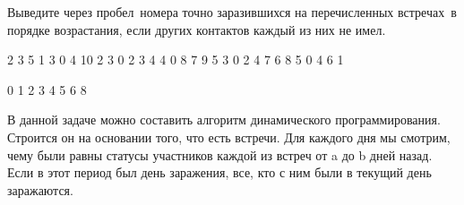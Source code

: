 Выведите через пробел номера точно заразившихся на перечисленных встречах в порядке возрастания, если других контактов каждый из них не имел.


\begin{myverbbox}[\small]{\vinput}
    2 3
    5
    1 3
    0 4 10
    2 3
    0 2 3
    4 4
    0 8 7 9
    5 3
    0 2 4
    7 6
    8 5 0 4 6 1
\end{myverbbox}

\begin{myverbbox}[\small]{\voutput}
    0 1 2 3 4 5 6 8
\end{myverbbox}

\solutionSection

В данной задаче можно составить алгоритм динамического программирования. Строится он на основании того, что есть встречи. Для каждого дня мы смотрим, чему были равны статусы участников каждой из встреч от a до b дней назад. Если в этот период был день заражения, все, кто с ним были в текущий день заражаются. 

